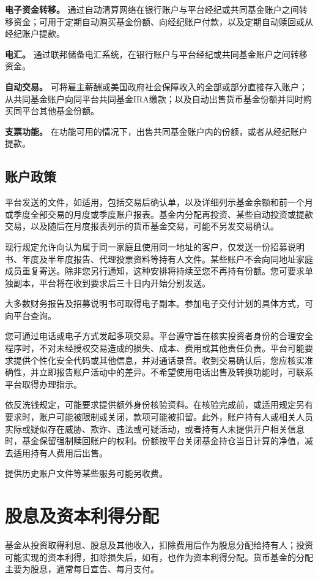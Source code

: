 \documentclass[UTF8,fontset=none,11pt,a4paper]{ctexart}
\begin{document}
\textbf{电子资金转移。} 通过自动清算网络在银行账户与平台经纪或共同基金账户之间转移资金；可用于定期自动购买基金份额、向经纪账户付款，以及定期自动赎回或从经纪\allowbreak\mbox{账户提款。}


\textbf{电汇。} 通过联邦储备电汇系统，在银行账户与平台经纪或共同基金账户之间\allowbreak\mbox{转移资金。}


\textbf{自动交易。} 可将雇主薪酬或美国政府社会保障收入的全部或部分直接存入账户；从共同基金账户向同平台共同基金IRA缴款；以及自动出售货币基金份额并同时购买同平台其他\allowbreak\mbox{基金份额。}


\textbf{支票功能。} 在功能可用的情况下，出售共同基金账户内的份额，或者从经纪\allowbreak\mbox{账户提款。}


\subsection*{账户政策}
平台发送的文件，如适用，包括交易后确认单，以及详细列示基金余额和前一个月或季度全部交易的月度或季度账户报表。基金内分配再投资、某些自动投资或提款交易，以及随后在月度报表列示的货币基金交易，可能不另发\allowbreak\mbox{交易确认。}


现行规定允许向认为属于同一家庭且使用同一地址的客户，仅发送一份招募说明书、年度及半年度报告、代理投票资料等持有人文件。某些账户不会向同地址家庭成员重复寄送。除非您另行通知，这种安排将持续至您不再持有份额。您可要求单独副本，平台将在收到要求后三十日内开始\allowbreak\mbox{分别发送。}


大多数财务报告及招募说明书可取得电子副本。参加电子交付计划的具体方式，可向\allowbreak\mbox{平台查询。}


您可通过电话或电子方式发起多项交易。平台遵守旨在核实投资者身份的合理安全程序时，不对未经授权交易造成的损失、成本、费用或其他责任负责。平台可能要求提供个性化安全代码或其他信息，并对通话录音。收到交易确认后，您应核实准确性，并立即报告账户活动中的差异。不希望使用电话出售及转换功能时，可联系平台取得\allowbreak\mbox{办理指示。}


依反洗钱规定，可能要求提供额外身份核验资料。在核验完成前，或适用规定另有要求时，账户可能被限制或关闭，款项可能被扣留。此外，账户持有人或相关人员实际或疑似存在威胁、欺诈、违法或可疑活动，或者持有人未提供开户相关信息时，基金保留强制赎回账户的权利。份额按平台关闭基金持仓当日计算的净值，减去适用持有人费\allowbreak\mbox{用后出售。}


提供历史账户文件等某些服务可\allowbreak\mbox{能另收费。}


\section*{股息及资本利得分配}
基金从投资取得利息、股息及其他收入，扣除费用后作为股息分配给持有人；投资可能实现的资本利得，扣除损失后，如有，也作为资本利得分配。货币基金的分配主要为股息，通常每日宣告、\allowbreak\mbox{每月支付。}
\end{document}
